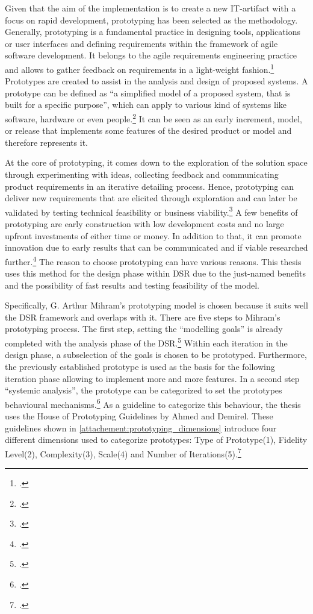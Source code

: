 Given that the aim of the implementation is to create a new \ac{IT}-artifact with a focus on rapid development, prototyping has been selected as the methodology.
Generally, prototyping is a fundamental practice in designing tools, applications or user interfaces and defining requirements within the framework of agile software development.
It belongs to the agile requirements engineering practice and allows to gather feedback on requirements in a light-weight fashion.\footcite[cf.][1]{bjarnasonModelSoftwarePrototyping2021a}
Prototypes are created to assist in the analysis and design of proposed systems.
A prototype can be defined as ``a simplified model of a proposed system, that is built for a specific purpose'', which can apply to various kind of systems like software, hardware or even people.\footcite[][470]{luqiRapidSoftwarePrototyping1992}
It can be seen as an early increment, model, or release that implements some features of the desired product or model and therefore represents it. 

At the core of prototyping, it comes down to the exploration of the solution space through experimenting with ideas,
collecting feedback and
communicating product requirements in an iterative detailing process.
Hence, prototyping can deliver new requirements that are elicited through exploration and can later be validated 
by testing technical feasibility or business viability.\footcite[cf.][8]{bjarnasonModelSoftwarePrototyping2021a}
A few benefits of prototyping are early construction with low development costs and no large upfront investments of either time or money.
In addition to that, it can promote innovation due to early results that can be communicated and if viable researched further.\footcite[cf.][25]{nelsonSoftwarePrototyping2016}
The reason to choose prototyping can have various reasons. 
This thesis uses this method for the design phase within \ac{DSR} due to the just-named benefits and the possibility of fast results and testing feasibility of the model.

Specifically, G. Arthur Mihram's prototyping model is chosen because it suits well the \ac{DSR} framework and overlaps with it. 
There are five steps to Mihram's prototyping process.
The first step, setting the ``modelling goals'' is already completed with the analysis phase of the \ac{DSR}.\footcite[cf.][71]{mihramSimulationMethodology1976}
Within each iteration in the design phase, a subselection of the goals is chosen to be prototyped. 
Furthermore, the previously established prototype is used as the basis for the following iteration phase allowing to implement more and more features.
In a second step ``systemic analysis'', the prototype can be categorized to set the prototypes behavioural mechanisms.\footcite[cf.][71-72]{mihramSimulationMethodology1976}
As a guideline to categorize this behaviour, the thesis uses the House of Prototyping Guidelines by Ahmed and Demirel.
These guidelines shown in \ref{attachement:prototyping_dimensions} introduce four different dimensions used to categorize prototypes:
Type of Prototype(1), Fidelity Level(2), Complexity(3), Scale(4) and Number of Iterations(5).\footcite[cf.][6-7]{ahmedPrototypingFrameworkHumanCentered2021}


